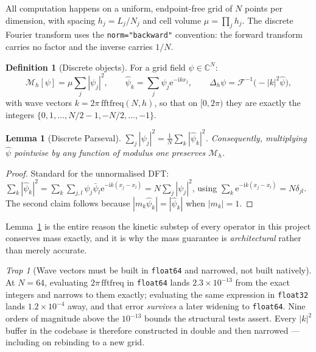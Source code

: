 \documentclass[11pt,a4paper]{article}
\theoremstyle{plain}
\newtheorem{lemma}[theorem]{Lemma}
\theoremstyle{definition}
\newtheorem{definition}[theorem]{Definition}
\theoremstyle{remark}
\newtheorem{trap}[theorem]{Trap}
\newcommand{\C}{\mathbb{C}}
\newcommand{\iu}{\mathrm{i}}
\newcommand{\eu}{\mathrm{e}}
\newcommand{\lap}{\Delta}
\newcommand{\Mass}{\mathcal{M}}
\newcommand{\code}[1]{\texttt{\small #1}}
\begin{document}
All computation happens on a uniform, endpoint-free grid of $N$ points per dimension,
with spacing $h_j = L_j/N_j$ and cell volume $\mu = \prod_j h_j$. The discrete Fourier
transform uses the \code{norm="backward"} convention: the forward transform carries no
factor and the inverse carries $1/N$.

\begin{definition}[Discrete objects]
For a grid field $\psi\in\C^{N}$:
\[
\Mass_h[\psi] = \mu\sum_{j}|\psi_j|^2,\qquad
\widehat{\psi}_k = \sum_j \psi_j \eu^{-\iu k x_j},\qquad
\lap_h \psi = \mathcal{F}^{-1}\bigl(-|k|^2\widehat\psi\bigr),
\]
with wave vectors $k = 2\pi\,\mathrm{fftfreq}(N,h)$, so that on $[0,2\pi)$ they are exactly
the integers $\{0,1,\dots,N/2-1,-N/2,\dots,-1\}$.
\end{definition}

\begin{lemma}[Discrete Parseval]
\label{lem:parseval}
$\sum_j|\psi_j|^2 = \tfrac{1}{N}\sum_k|\widehat\psi_k|^2$. Consequently, multiplying
$\widehat\psi$ pointwise by any function of modulus one preserves $\Mass_h$.
\end{lemma}

\begin{proof}
Standard for the unnormalised DFT: $\sum_k|\widehat\psi_k|^2
= \sum_k\sum_{j,l}\psi_j\bar\psi_l\eu^{-\iu k(x_j-x_l)} = N\sum_j|\psi_j|^2$, using
$\sum_k \eu^{-\iu k(x_j-x_l)} = N\delta_{jl}$. The second claim follows because
$|m_k\widehat\psi_k| = |\widehat\psi_k|$ when $|m_k|=1$.
\end{proof}

Lemma~\ref{lem:parseval} is the entire reason the kinetic substep of every operator in
this project conserves mass exactly, and it is why the mass guarantee is
\emph{architectural} rather than merely accurate.

\begin{trap}[Wave vectors must be built in \texttt{float64} and narrowed, not built
natively]
\label{trap:k2}
At $N=64$, evaluating $2\pi\,\mathrm{fftfreq}$ in \code{float64} lands $2.3\times10^{-13}$
from the exact integers and narrows to them exactly; evaluating the same expression in
\code{float32} lands $1.2\times10^{-4}$ away, and that error \emph{survives} a later
widening to \code{float64}. Nine orders of magnitude above the $10^{-13}$ bounds the
structural tests assert. Every $|k|^2$ buffer in the codebase is therefore constructed in
double and then narrowed --- including on rebinding to a new grid.
\end{trap}
\end{document}
